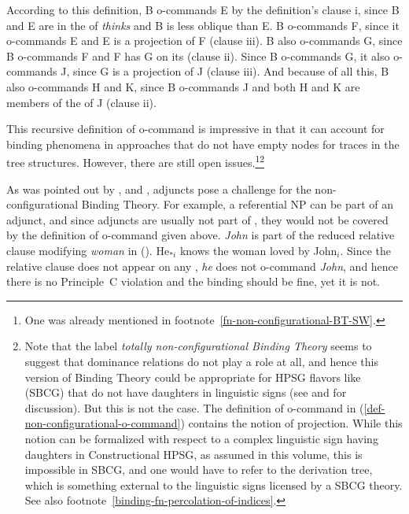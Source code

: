 \documentclass[output=paper,biblatex,babelshorthands,newtxmath,draftmode,colorlinks,citecolor=brown]{langscibook}
\begin{document}
According to this definition, B o-commands E by the definition's clause i, since B and E are in the \argstl of
\emph{thinks} and B is less oblique than E. B o-commands F, since it o-commands E and E
is a projection of F (clause iii). B also o-commands G, since B o-commands F and F has G on its
\argstl (clause ii). Since B o-commands G, it also o-commands J, since G is a projection of J
(clause iii). And because of all this, B also o-commands H and K, since B o-commands J and both H and
K are members of the \argstl of J (clause ii). 

This recursive definition of o-command is impressive in that it can account for binding phenomena
in approaches that do not have empty nodes for traces in the tree structures. However, there are still open
issues.\footnote{
One was already mentioned in footnote~\ref{fn-non-configurational-BT-SW}.
}\footnote{%
Note that the label \emph{totally non-configurational Binding Theory} seems to suggest that
dominance relations do not play a role at all, and hence this version of Binding Theory could be appropriate for
HPSG flavors like \sbcg (SBCG) that do not have daughters in linguistic signs (see \citealt{Sag2012a} and
 for discussion). But this is not the case. The definition of o-command in
(\ref{def-non-configurational-o-command}) contains the notion of projection. While this notion can
be formalized with respect to a complex linguistic sign having daughters in Constructional HPSG, as
assumed in this volume, this is impossible in SBCG, and one would have to refer to the derivation
tree, which is something external to the linguistic signs licensed by a SBCG theory. See also footnote~\ref{binding-fn-percolation-of-indices}.%
}

As was pointed out by \citet[]{HL96a}, \citet[Sect~20.4.1]{Mueller99a} and \citet{Walker2011a}, adjuncts pose a challenge for the
non-configurational Binding Theory. For example, a referential NP can be part of an adjunct, and
since adjuncts are usually not part of \argstls, they would not be covered by the definition of
o-command given above. \emph{John} is part of the reduced relative clause modifying \emph{woman} in
().
\ea
\label{ex-he-knows-the-woman-loved-by-John}
He$_{*i}$ knows the woman loved by John$_i$.
\z
Since the relative clause does not appear on any \argstl, \emph{he} does not o-command \emph{John},
and hence there is no Principle~C violation and the binding should be fine, yet it is not.
\end{document}
